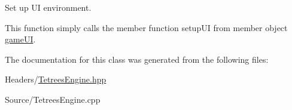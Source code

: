 Set up UI environment. 

This function simply calls the member function setup\+UI from member object \hyperlink{classTetreesEngine_a01bf1d438236d5f57129ffb22adf59ce}{game\+UI}. 

The documentation for this class was generated from the following files\+:\begin{DoxyCompactItemize}
\item 
Headers/\hyperlink{TetreesEngine_8hpp}{Tetrees\+Engine.\+hpp}\item 
Source/Tetrees\+Engine.\+cpp\end{DoxyCompactItemize}
